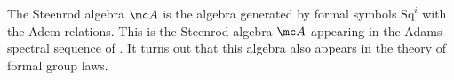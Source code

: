 \documentclass[../notes.tex]{subfiles}
\begin{document}
\begin{remark}
	The Steenrod algebra $\mc A$ is the algebra generated by formal symbols $\mathrm{Sq}^i$ with the Adem relations. This is the Steenrod algebra $\mc A$ appearing in the Adams spectral sequence of . It turns out that this algebra also appears in the theory of formal group laws.
\end{remark}
\end{document}
